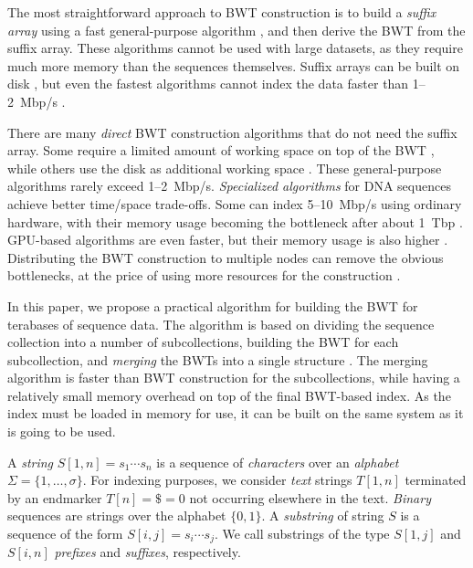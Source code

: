 \documentclass[smallabstract,smallcaptions]{dccpaper}
\newcommand{\set}[1]{\ensuremath{\{ #1 \}}}
\newcommand{\BWT}{\textsf{BWT}}
\begin{document}
The most straightforward approach to \BWT{} construction is to build a \emph{suffix array} using a fast general-purpose algorithm \cite{Mori2008,Nong2011}, and then derive the \BWT{} from the suffix array. These algorithms cannot be used with large datasets, as they require much more memory than the sequences themselves. Suffix arrays can be built on disk \cite{Gonnet1992}, but even the fastest algorithms cannot index the data faster than 1\nobreakdash--2~Mbp/s
\cite{Bingmann2013,Kaerkkaeinen2014a,Nong2014,Nong2015,Kaerkkaeinen2015a,Liu2015a}.

There are many \emph{direct} \BWT{} construction algorithms that do not need the suffix array. Some require a limited amount of working space on top of the \BWT{} \cite{Hon2007,Kaerkkaeinen2007,Siren2009,Okanohara2009}, while others use the disk as additional working space \cite{Ferragina2012,Beller2013}. These general-purpose algorithms rarely exceed 1\nobreakdash--2~Mbp/s. \emph{Specialized algorithms} for DNA sequences achieve better time/space trade-offs. Some can index 5\nobreakdash--10~Mbp/s using ordinary hardware, with their memory usage becoming the bottleneck after about 1~Tbp \cite{Bauer2013,Li2014a}. GPU-based algorithms are even faster, but their memory usage is also higher \cite{Liu2014,Pantaleoni2014}. Distributing the \BWT{} construction to multiple nodes can remove the obvious bottlenecks, at the price of using more resources for the construction \cite{Wang2015}.

In this paper, we propose a practical algorithm for building the \BWT{} for terabases of sequence data. The algorithm is based on dividing the sequence collection into a number of subcollections, building the \BWT{} for each subcollection, and \emph{merging} the \BWT{}s into a single structure \cite{Siren2009}. The merging algorithm is faster than \BWT{} construction for the subcollections, while having a relatively small memory overhead on top of the final \BWT-based index. As the index must be loaded in memory for use, it can be built on the same system as it is going to be used.



A \emph{string} $S[1,n] = s_{1} \dotsm s_{n}$ is a sequence of \emph{characters} over an \emph{alphabet} $\Sigma = \set{1, \dotsc, \sigma}$. For indexing purposes, we consider \emph{text} strings $T[1,n]$ terminated by an endmarker $T[n] = \$ = 0$ not occurring elsewhere in the text. \emph{Binary} sequences are strings over the alphabet $\set{0, 1}$. A \emph{substring} of string $S$ is a sequence of the form $S[i,j] = s_{i} \dotsm s_{j}$. We call substrings of the type $S[1,j]$ and $S[i,n]$ \emph{prefixes} and \emph{suffixes}, respectively.
\end{document}
